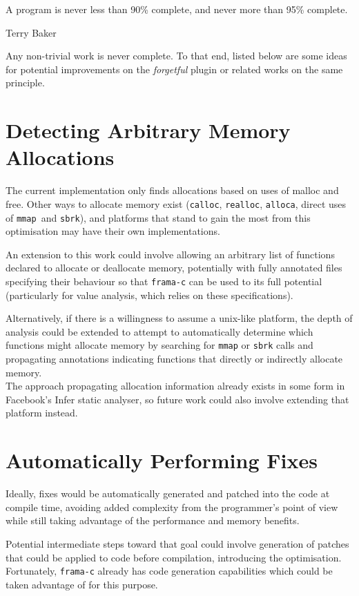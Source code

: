 \epigraph{A program is never less than 90\% complete, and never more than 95\% complete.}{Terry Baker}

Any non-trivial work is never complete. To that end, listed below are some ideas for potential improvements on the \emph{forgetful} plugin or related works on the same principle.

\section{Detecting Arbitrary Memory Allocations}

The current implementation only finds allocations based on uses of malloc and free. Other ways to allocate memory exist (\texttt{calloc}, \texttt{realloc}, \texttt{alloca}, direct uses of \texttt{mmap }and \texttt{sbrk}), and platforms that stand to gain the most from this optimisation may have their own implementations.

An extension to this work could involve allowing an arbitrary list of functions declared to allocate or deallocate memory, potentially with fully annotated files specifying their behaviour so that \texttt{frama-c} can be used to its full potential (particularly for value analysis, which relies on these specifications).

Alternatively, if there is a willingness to assume a unix-like platform, the depth of analysis could be extended to attempt to automatically determine which functions might allocate memory by searching for \texttt{mmap} or \texttt{sbrk} calls and propagating annotations indicating functions that directly or indirectly allocate memory.\\
The approach propagating allocation information already exists in some form in Facebook's Infer \cite{fbinfer} static analyser, so future work could also involve extending that platform instead.

\section{Automatically Performing Fixes}

Ideally, fixes would be automatically generated and patched into the code at compile time, avoiding added complexity from the programmer's point of view while still taking advantage of the performance and memory benefits.

Potential intermediate steps toward that goal could involve generation of patches that could be applied to code before compilation, introducing the optimisation. Fortunately, \texttt{frama-c} already has code generation capabilities which could be taken advantage of for this purpose.

